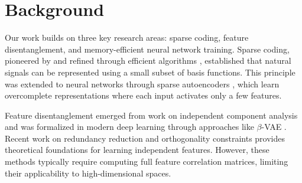 \documentclass{article} %
\begin{document}






\section{Background}
\label{sec:background}

Our work builds on three key research areas: sparse coding, feature disentanglement, and memory-efficient neural network training. Sparse coding, pioneered by \cite{Olshausen1996EmergenceOS} and refined through efficient algorithms \cite{Lee2006EfficientSC}, established that natural signals can be represented using a small subset of basis functions. This principle was extended to neural networks through sparse autoencoders \cite{Ngiam2011SparseF}, which learn overcomplete representations where each input activates only a few features.

Feature disentanglement emerged from work on independent component analysis \cite{Bell1995AnIA} and was formalized in modern deep learning through approaches like $\beta$-VAE \cite{Higgins2016betaVAELB}. Recent work on redundancy reduction \cite{Zbontar2021BarlowTS} and orthogonality constraints \cite{Vorontsov2017OnOA} provides theoretical foundations for learning independent features. However, these methods typically require computing full feature correlation matrices, limiting their applicability to high-dimensional spaces.
\end{document}
